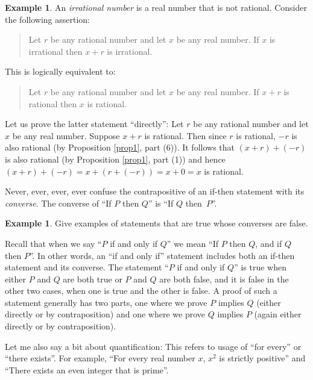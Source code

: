 \documentclass[12pt]{amsart}
\numberwithin{equation}{section}
\theoremstyle{plain} %
\theoremstyle{definition}
\newtheorem{ex}[equation]{Example}
\theoremstyle{remark}
\begin{document}
\begin{ex} An \textit{irrational number} is a real number that is not rational. Consider the following assertion: 
	\begin{quote}
		Let $r$ be any rational number and let $x$ be any real number. If $x$ is irrational then $x + r$ is irrational. 
	\end{quote}
	
	This  is logically equivalent to:
	\begin{quote} 
		Let $r$ be any rational number and let $x$ be any real number. If $x+r$ is rational then $x$ is rational. 
	\end{quote}
	
	Let us prove the latter statement ``directly'': Let $r$ be any
	rational number and let $x$ be any real number. Suppose $x + r$ is rational. Then since $r$ is rational, $-r$ is also rational (by Proposition \ref{prop1}, part (6)).
	It follows that $(x + r) + (-r)$ is also rational (by Proposition \ref{prop1}, part (1)) and hence $(x+r) + (-r) = x + (r +(-r)) = x + 0 = x$ is rational.
\end{ex}



Never, ever, ever, ever confuse the contrapositive of an if-then statement with its {\em converse}. The converse of ``If $P$ then $Q$'' is ``If $Q$ then~$P$''. 

\begin{ex} Give examples of statements that are true whose converses are false.\end{ex}


Recall that when we say ``$P$ if and only if $Q$'' we mean ``If $P$ then $Q$, and if $Q$ then $P$''. In other words, an ``if and only if'' statement includes both
an if-then statement and its converse. The statement 
``$P$ if and only if $Q$'' is true when either $P$ and $Q$ are both true or $P$ and $Q$ are both false, and it is false in the other two cases, when one is true and the other is
false. A proof of such a statement generally has two parts, one where we prove $P$ implies $Q$ (either directly or by contraposition) and one where we prove $Q$ implies $P$ (again either directly or by contraposition).



Let me also say a bit about quantification: This refers to usage of ``for every'' or ``there exists''. For example, ``For every real number $x$, $x^2$ is
strictly positive'' and ``There exists an even integer that is prime''. 
\end{document}
